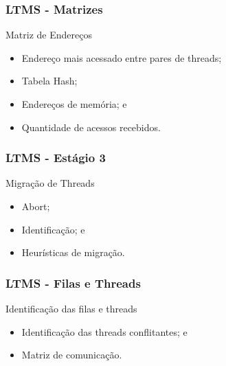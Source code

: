 \documentclass[10pt, pdf,xcolor=pdftex,dvipsnames,table]{beamer}
\begin{document}
\begin{frame} \frametitle{LTMS - Matrizes}
    \begin{block}{Matriz de Endereços}
        \begin{itemize}
        	\item Endereço mais acessado entre pares de threads;
        	\item Tabela Hash;
        	\item Endereços de memória; e 
            \item Quantidade de acessos recebidos.
        \end{itemize}
    \end{block}
\end{frame}

\begin{frame} \frametitle{LTMS - Estágio 3}
    \begin{block}{Migração de Threads}
        \begin{itemize}
        	\item Abort;
        	\item Identificação; e
            \item Heurísticas de migração.
        \end{itemize}
    \end{block}
\end{frame}

\begin{frame} \frametitle{LTMS - Filas e Threads}
    \begin{block}{Identificação das filas e threads}
        \begin{itemize}
        	\item Identificação das threads conflitantes; e
        	\item Matriz de comunicação.
        \end{itemize}
    \end{block}
\end{frame}
\end{document}
